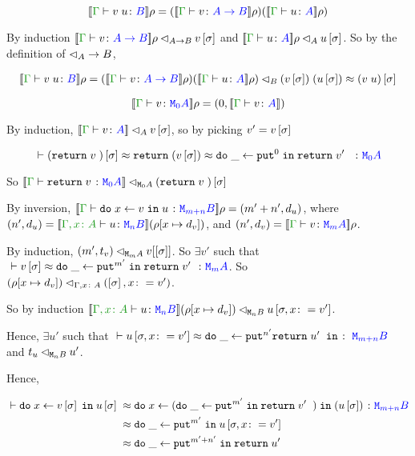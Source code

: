 \documentclass{Report}
\begin{document}
\begin{equation}
    \deno{\gtyperelation{\apply{v}{u}}{B}}\rho = (\deno{\gtyperelation{v}{\ab}}\rho)(\deno{\gtyperelation{u}{A}}\rho)
\end{equation}

By induction $\logRel{\deno{\gtyperelation{v}{\ab}}\rho}{\ab}{v\ssi}$ and $\logRel{\deno{\gtyperelation{u}{A}}\rho}{A}{u\ssi}$. So by the definition of $\lhd_A\rightarrow B$, 

\begin{align}
    \deno{\gtyperelation{\apply{v}{u}}{B}}\rho =\logRel{(\deno{\gtyperelation{v}{\ab}}\rho)(\deno{\gtyperelation{u}{A}}\rho)}{B}{\apply{(v\ssi)}{(u\ssi)}\beequiv (\apply{v}{u})\ssi}
\end{align}


\begin{equation}
    \deno{\gtyperelation{v}{\M{0}{A}}}\rho = (0, \deno{\gtyperelation{v}{A}})
\end{equation}

By induction, $\logRel{\deno{\gtyperelation{v}{A}}}{A}{v\ssi}$, so by picking $v' = v\left[\sigma\right]$

\begin{equation}
    \zberelation{(\return{v})\ssi}{\return{(v\ssi)\beequiv \doin{\_}{\put^0}{\return{v'}}}}{\M{0}{A}}
\end{equation}

So $\logRel{\deno{\gtyperelation{\return{v}}{\M{0}{A}}}}{\M{0}{A}}{(\return{v})\ssi}$


By inversion, $\deno{\gtyperelation{\doin{x}{v}{u}}{\M{m+n}{B}}}\rho = (m'+n', d_u)$, where $(n', d_u) = \deno{\typerelation{\gax}{u}{\mnb}}(\rho[x\mapsto d_v])$, and $(n', d_v) = \deno{\gtyperelation{v}{\mma}}\rho$.

By induction, $(m', t_v) \lhd_{\texttt{M}_{m}{A}} v[\left[\sigma\right]]$. So $\exists v'$ such that $\zberelation{v\ssi}{\doin{\_}{\put^{m'}}{\return{v'}}}{\mma}$. So $(\rho[x\mapsto d_v]) \lhd_{\Gamma, x\colon A} (\left[\sigma\right], x\colon= v')$.

So by induction $\logRel{\deno{\typerelation{\gax}{u}{\mnb}}(\rho[x\mapsto d_v])}{\mnb}{u\sub{\si, x\setto v'}}$.

Hence, $\exists u'$ such that $\zberelation{u\sub{\si, x\setto v'}}{\doin{\_}{\put^{n'}{\return{u'}}}}{\M{m + n}{B}}$ and $t_u \lhd_{\texttt{M}_{n}{B}} u'$.

Hence,

\begin{align}
    \zberelation{\doin{x}{v\ssi}{u\ssi}&}{\doin{x}{(\doin{\_}{\put^{m'}}{\return{v'}})}{(u\ssi)}}{\M{m+n}{B}}\\
    &\beequiv\doin{\_}{\put^{m'}}{u\sub{\si, x\setto{v'}}}\\
    &\beequiv\doin{\_}{\put^{m'+n'}}{\return{u'}}
\end{align}
\end{document}
